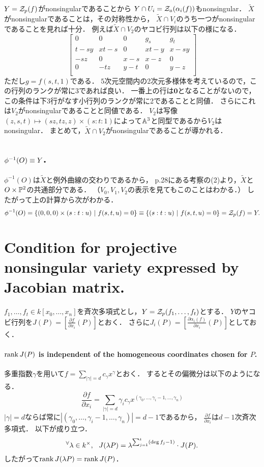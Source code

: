 \documentclass[a4paper]{jsarticle}
\begin{document}
    $Y=\mathcal{Z}_p(f)$がnonsingularであることから
    $Y \cap U_i=\mathcal{Z}_a(\alpha_i(f))$もnonsingular．
    $\tilde{X}$がnonsingularであることは，その対称性から，
    $\tilde{X} \cap V_i$のうち一つがnonsingularであることを見れば十分．
    例えば$\tilde{X} \cap V_2$のヤコビ行列は以下の様になる．
    \[
    \begin{bmatrix}
        0       & 0     & 0     & g_s   & g_t   \\
        t-sy    & xt-s  & 0     & xt-y  & x-sy  \\
        -sz     & 0     & x-s   & x-z   & 0     \\
        0       & -tz   & y-t   & 0     & y-z   \\
    \end{bmatrix}
    \]
    ただし$g=f(s,t,1)$である．
    $5$次元空間内の2次元多様体を考えているので，この行列のランクが常に3であれば良い．
    一番上の行は$\mathbf{0}$となることがないので，この条件は下3行がなす小行列のランクが常に2であることと同値．
    さらにこれは$V_2$がnonsingularであることと同値である．
    $V_2$は写像$(z,s,t) \mapsto (sz,tz,z) \times (s:t:1)$によって$\mathbb{A}^3$と同型であるから$V_2$はnonsingular．
    まとめて，$\tilde{X} \cap V_2$がnonsingularであることが導かれる．

    \subsection{$\phi^{-1}(O) \equiv Y$.}
    $\phi^{-1}(O)$は$\tilde{X}$と例外曲線の交わりであるから，
    p.28にある考察の(2)より，$\tilde{X}$と$O \times \mathbb{P}^2$の共通部分である．
    （$V_0, V_1, V_2$の表示を見てもこのことはわかる．）
    したがって上の計算から次がわかる．
    \[ \phi^{-1}(O)=\{ (0,0,0) \times (s:t:u) ~|~ f(s,t,u)=0 \} \equiv \{(s:t:u) ~|~ f(s,t,u)=0 \}=\mathcal{Z}_p(f)=Y. \]

\section{Condition for projective nonsingular variety expressed by Jacobian matrix.} %
    $f_1,\dots,f_t \in k[x_0,\dots,x_n]$を斉次多項式とし，$Y=\mathcal{Z}_p(f_1,\dots,f_t)$とする．
    $Y$のヤコビ行列を$J(P)=\left[ \frac{\partial f}{\partial x_i}(P) \right]$とおく．
    さらに$J_i(P)=\left[ \frac{\partial \alpha_i(f)}{\partial x_i}(P) \right]$としておく．

    \paragraph{$\operatorname{rank} J(P)$ is independent of the homogeneous coordinates chosen for $P$.}
    多重指数$\gamma$を用いて$f=\sum_{|\gamma|=d}{c_{\gamma} x^{\gamma}}$とおく．
    するとその偏微分は以下のようになる．
    \[ \frac{\partial f}{\partial x_i}=\sum_{|\gamma|=d}{\gamma_i c_{\gamma} x^{(\gamma_0, \dots, \gamma_i-1, \dots, \gamma_n)}} \]
    $|\gamma|=d$ならば常に$|(\gamma_0, \dots, \gamma_i-1, \dots, \gamma_n)|=d-1$であるから，
    $\frac{\partial f}{\partial x_i}$は$d-1$次斉次多項式．
    以下が成り立つ．
    \[ {}^{\forall} \lambda \in k^{\times},~~ J(\lambda P)=\lambda^{\sum_{j=1}^{t}(\deg f_j-1)} \cdot J(P). \]
    したがって$\operatorname{rank} J(\lambda P)=\operatorname{rank} J(P)$．
\end{document}
